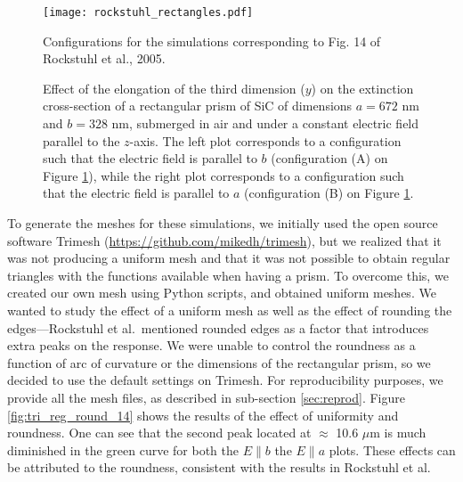 \begin{figure}
    \centering
    \texttt{[image: rockstuhl\_rectangles.pdf]} 
    \caption{Configurations for the simulations corresponding to Fig. 14 of Rockstuhl et al., 2005.}
    \label{fig:rectangle_sketch}
\end{figure}

\begin{figure}
    \centering
    \caption{Effect of the elongation of the third dimension ($y$) on the 
        extinction cross-section of a rectangular prism of SiC of dimensions $a=672$ nm 
        and $b=328$ nm, submerged in air and under a constant electric field 
        parallel to the $z$-axis. The left plot corresponds to a configuration such that the electric 
        field is parallel to $b$ (configuration (A) on Figure \ref{fig:rectangle_sketch}), while the 
        right plot corresponds to a configuration such that the electric field is 
        parallel to $a$ (configuration (B) on Figure \ref{fig:rectangle_sketch}.}
    \label{fig:ext_y_14}   
 \end{figure}


To generate the meshes for these simulations, we initially used the open source software Trimesh 
(\url{https://github.com/mikedh/trimesh}), but we realized that it was not producing a 
uniform mesh and that it was not possible to obtain regular triangles with the functions 
available when having a prism. To overcome this, we created our own mesh using Python scripts,
and obtained uniform meshes. We wanted to study the effect of a uniform mesh as well as the effect
of rounding the edges---Rockstuhl et al.\ mentioned rounded edges
as a factor that introduces extra peaks on the response. We were unable to control the 
roundness as a function of arc of curvature or the dimensions of the rectangular prism, so we 
decided to use the default settings on Trimesh. 
For reproducibility purposes, we provide all the mesh files, as described in sub-section \ref{sec:reprod}.
Figure \ref{fig:tri_reg_round_14} shows the 
results of the effect of uniformity and roundness. One can see that the second peak located at $\approx$ 10.6 $\mu$m  is much diminished in the green curve for both the $E\parallel b$  the $E\parallel a$ plots. 
These effects can be attributed 
to the roundness, consistent with the results in Rockstuhl et al. 


